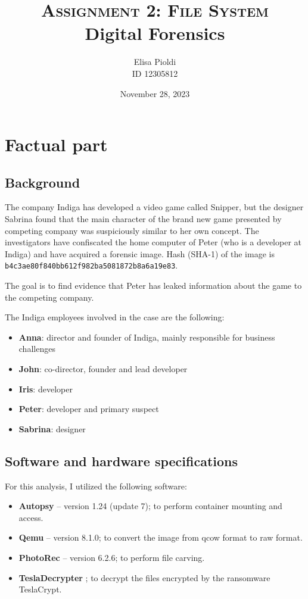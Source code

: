\documentclass[12pt]{article}
\title{\textbf{\textsc{Assignment 2: File System}}\\Digital Forensics}
\author{Elisa Pioldi\\
        ID 12305812}
\date{November 28, 2023}
\begin{document}
\maketitle

\section{Factual part}

\subsection{Background}

The company Indiga has developed a video game called Snipper, but the designer Sabrina found that the main character of the brand new game presented by competing company was suspiciously similar to her own concept.
The investigators have confiscated the home computer of Peter (who is a developer at Indiga) and have acquired a forensic image. 
Hash (SHA-1) of the image is \texttt{b4c3ae80f840bb612f982ba5081872b8a6a19e83}.

The goal is to find evidence that Peter has leaked information about the game to the competing company.

The Indiga employees involved in the case are the following:
\begin{itemize}
    \item \textbf{Anna}: director and founder of Indiga, mainly responsible for business challenges
    \item \textbf{John}: co-director, founder and lead developer
    \item \textbf{Iris}: developer
    \item \textbf{Peter}: developer and primary suspect
    \item \textbf{Sabrina}: designer
\end{itemize}

\subsection{Software and hardware specifications}
\label{sec:specs}

For this analysis, I utilized the following software:

\begin{itemize}
    \item \textbf{Autopsy} \cite{autopsy} -- version 1.24 (update 7); to perform container mounting and access.
    \item \textbf{Qemu} \cite{qemu} -- version 8.1.0; to convert the image from qcow format to raw format.
    \item \textbf{PhotoRec} \cite{photorec} -- version 6.2.6; to perform file carving. 
    \item \textbf{TeslaDecrypter} \cite{tesla-decrypt}; to decrypt the files encrypted by the ransomware TeslaCrypt.
\end{itemize}
\end{document}
